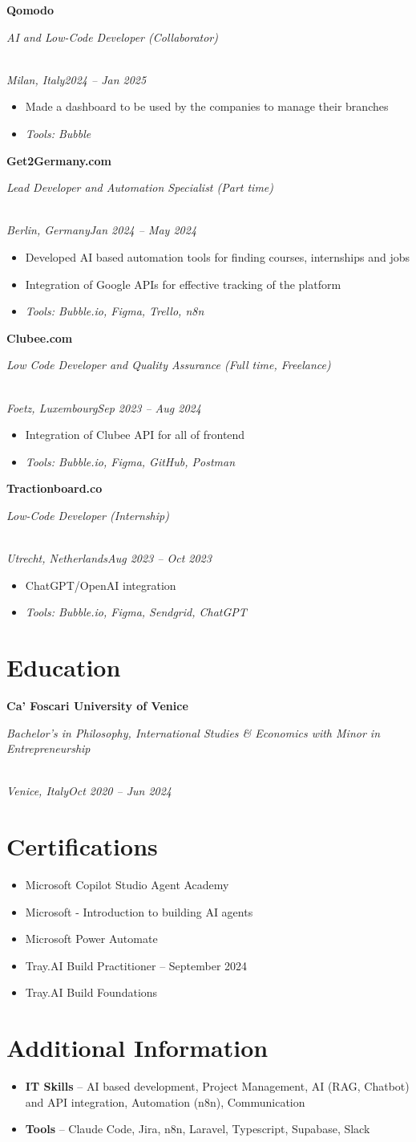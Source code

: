 \documentclass[a4paper,10pt]{article}
\newcommand{\role}[4]{\vspace{3pt}\noindent\hspace{0.6em}\parbox[t]{0.38\textwidth}{\raggedright\textbf{#1}}\hfill\parbox[t]{0.58\textwidth}{\raggedleft\textit{#2}}\\{\textit{#3}\hfill\textit{#4}}\vspace{1pt}}
\begin{document}
\role{Qomodo}{AI and Low-Code Developer (Collaborator)}{Milan, Italy}{2024 -- Jan 2025}
\begin{itemize}
\item Made a dashboard to be used by the companies to manage their branches
\item \textit{Tools: Bubble}
\end{itemize}

\role{Get2Germany.com}{Lead Developer and Automation Specialist (Part time)}{Berlin, Germany}{Jan 2024 -- May 2024}
\begin{itemize}
\item Developed AI based automation tools for finding courses, internships and jobs
\item Integration of Google APIs for effective tracking of the platform
\item \textit{Tools: Bubble.io, Figma, Trello, n8n}
\end{itemize}

\role{Clubee.com}{Low Code Developer and Quality Assurance (Full time, Freelance)}{Foetz, Luxembourg}{Sep 2023 -- Aug 2024}
\begin{itemize}
\item Integration of Clubee API for all of frontend
\item \textit{Tools: Bubble.io, Figma, GitHub, Postman}
\end{itemize}

\role{Tractionboard.co}{Low-Code Developer (Internship)}{Utrecht, Netherlands}{Aug 2023 -- Oct 2023}
\begin{itemize}
\item ChatGPT/OpenAI integration
\item \textit{Tools: Bubble.io, Figma, Sendgrid, ChatGPT}
\end{itemize}

\section{Education}
\role{Ca' Foscari University of Venice}{Bachelor's in Philosophy, International Studies \& Economics with Minor in Entrepreneurship}{Venice, Italy}{Oct 2020 -- Jun 2024}

\section{Certifications}
\begin{itemize}
\item Microsoft Copilot Studio Agent Academy
\item Microsoft - Introduction to building AI agents
\item Microsoft Power Automate
\item Tray.AI Build Practitioner -- September 2024
\item Tray.AI Build Foundations
\end{itemize}

\section{Additional Information}
\begin{itemize}
\item \textbf{IT Skills} -- AI based development, Project Management, AI (RAG, Chatbot) and API integration, Automation (n8n), Communication
\item \textbf{Tools} -- Claude Code, Jira, n8n, Laravel, Typescript, Supabase, Slack
\end{itemize}
\end{document}
